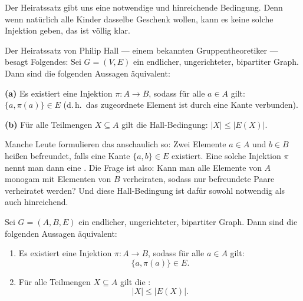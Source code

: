 \begin{spoken-clean}[01:01:27 - 01:04:12]
Der Heiratssatz gibt uns eine notwendige und hinreichende Bedingung. Denn wenn natürlich alle Kinder dasselbe Geschenk wollen, kann es keine solche Injektion geben, das ist völlig klar.

Der Heiratssatz von Philip Hall --- einem bekannten Gruppentheoretiker --- besagt Folgendes: Sei $G = (V, E)$ ein endlicher, ungerichteter, bipartiter Graph. Dann sind die folgenden Aussagen äquivalent: 

\textbf{(a)} Es existiert eine Injektion $\pi \colon A \to B$, sodass für alle $a \in A$ gilt: $\{a, \pi(a)\} \in E$ (d.\,h.\ das zugeordnete Element ist durch eine Kante verbunden).

\textbf{(b)} Für alle Teilmengen $X \subseteq A$ gilt die Hall-Bedingung: $|X| \le |E(X)|$.

Manche Leute formulieren das anschaulich so: Zwei Elemente $a \in A$ und $b \in B$ heißen befreundet, falls eine Kante $\{a, b\} \in E$ existiert. Eine solche Injektion $\pi$ nennt man dann eine . Die Frage ist also: Kann man alle Elemente von $A$ monogam mit Elementen von $B$ verheiraten, sodass nur befreundete Paare verheiratet werden? Und diese Hall-Bedingung ist dafür sowohl notwendig als auch hinreichend.
\end{spoken-clean}

\begin{math-stroke}
\begin{theorem}\label{thm:heiratssatz-hall}
Sei $G = (A, B, E)$ ein endlicher, ungerichteter, bipartiter Graph. Dann sind die folgenden Aussagen äquivalent:
\begin{enumerate}[label=\textbf{(\alph*)}]
    \item Es existiert eine Injektion $\pi \colon A \to B$, sodass für alle $a \in A$ gilt:
    \[
    \{a, \pi(a)\} \in E.
    \]
    \item Für alle Teilmengen $X \subseteq A$ gilt die :
    \begin{equation}\label{eq:hall-bedingung}
    |X| \le |E(X)|.
    \end{equation}
\end{enumerate}
\end{theorem}
\end{math-stroke}

